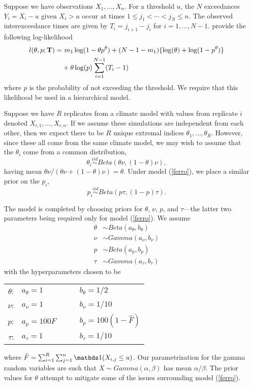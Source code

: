 Suppose we have observations $X_1,\ldots,X_n$. For a threshold $u$, the $N$ exceedances $Y_i=X_i-u$ given $X_i>u$ occur at times $1\leq j_1<\cdots< j_N\leq n$. The observed interexceedance times are given by $T_i=j_{i+1}-j_i$ for $i=1,\ldots,N-1$. \cite{ferro2003inference} provide the following log-likelihood
\begin{align}
l(\theta, p; \mathbf{\bm{T}}) =&~ m_1\log(1-\theta p^\theta) + (N-1-m_1)\{\log(\theta)+ \log(1-p^\theta)\} \nonumber \\
 &+ \theta\log(p)\sum_{i=1}^{N-1}(T_i-1) \label{ferro}
\end{align}
where $p$ is the probability of not exceeding the threshold. We require that this likelihood be used in a hierarchical model.

Suppose we have $R$ replicates from a climate model with values from replicate $i$ denoted $X_{i,1},\ldots,X_{i,n}$. If we assume these simulations are independent from each other, then we expect there to be $R$ unique extremal indices $\theta_1,\ldots,\theta_R$. However, since these all come from the same climate model, we may wish to assume that the $\theta_i$ come from a common distribution,
\[ \theta_i \overset{iid}\sim Beta\left(\theta\nu, (1-\theta)\nu\right), \]
having mean $\theta\nu /(\theta\nu + (1-\theta)\nu) = \theta$. Under model (\ref{ferro}), we place a similar prior on the $p_i$,
\[ p_i \overset{iid}\sim Beta\left(p\tau, (1-p)\tau\right). \]

The model is completed by choosing priors for $\theta$, $\nu$, $p$, and $\tau$---the latter two parameters being required only for model (\ref{ferro}). We assume
\begin{align*}
\theta &\sim Beta(a_\theta, b_\theta) \\
\nu &\sim Gamma(a_\nu, b_\nu) \\
p &\sim Beta(a_p, b_p) \\
\tau &\sim Gamma(a_\tau, b_\tau) 
\end{align*}
with the hyperparameters chosen to be
\begin{center}
\begin{tabular}{rlcl}
$\theta$: & $a_\theta = 1          $ &~~& $b_\theta = 1/2             $ \\
$   \nu$: & $   a_\nu = 1          $ &~~& $   b_\nu = 1/10            $ \\
$     p$: & $     a_p = 100 \hat{F}$ &~~& $     b_p = 100 (1-\hat{F}) $ \\
$  \tau$: & $  a_\tau = 1          $ &~~& $  b_\tau = 1/10            $ \\
\end{tabular}
\end{center}
where $\hat{F}=\sum_{i=1}^R\sum_{j=1}^n \ind(X_{i,j}\leq u)$. Our parametrization for the gamma random variables are such that $X\sim Gamma(\alpha,\beta)$ has mean $\alpha/\beta$. The prior values for $\theta$ attempt to mitigate some of the issues surrounding model (\ref{ferro}).

